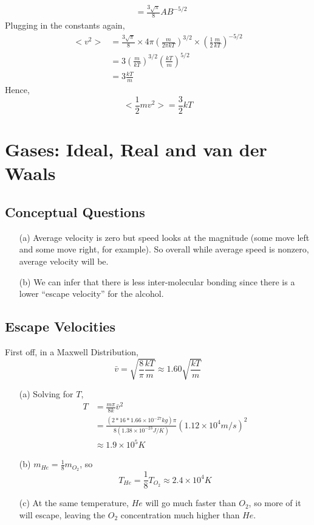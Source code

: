 \documentclass{article}
\begin{document}
\begin{itemize}
\begin{align*}
	&= \frac{3\sqrt{\pi}}{8}AB^{-5/2}
	\end{align*}
	Plugging in the constants again,
	\begin{align*}
	<v^2> &= \frac{3\sqrt{\pi}}{8}\times 4\pi\left(\frac{m}{2\pi kT}\right)^{3/2}\times \left(\frac{1}{2}\frac{m}{kT}\right)^{-5/2} \\
	&= 3\left(\frac{m}{kT}\right)^{3/2}\left(\frac{kT}{m}\right)^{5/2} \\
	&= 3\frac{kT}{m}
	\end{align*}
	Hence,
	\begin{equation}
	<\frac{1}{2}mv^2> = \frac{3}{2}kT
	\end{equation}
\end{itemize}

\newpage

\section{Gases: Ideal, Real and van der Waals}

\subsection{Conceptual Questions}

\begin{itemize}
	\item[(a)] Average velocity is zero but speed looks at the magnitude (some move left and some move right, for example). So overall while average speed is nonzero, average velocity will be.
	\item[(b)] We can infer that there is less inter-molecular bonding since there is a lower ``escape velocity'' for the alcohol.
\end{itemize}

\subsection{Escape Velocities}

First off, in a Maxwell Distribution,
\begin{equation}
\bar{v}=\sqrt{\frac{8}{\pi}\frac{kT}{m}} \approx 1.60\sqrt{\frac{kT}{m}}
\end{equation}
\begin{itemize}
	\item[(a)] Solving for $T$,
	\begin{align*}
	T &= \frac{m\pi}{8k}\bar{v}^2 \\
	&= \frac{(2*16*1.66\times10^{-27} kg)\pi}{8(1.38\times10^{-23} J/K)}(1.12\times 10^4 m/s)^2 \\
	&\approx 1.9\times10^5 K
	\end{align*}
	\item[(b)] $m_{He} = \frac{1}{8}m_{O_2}$, so
	\begin{equation}
	T_{He} = \frac{1}{8}T_{O_2}\approx2.4\times10^4 K
	\end{equation}
	\item[(c)] At the same temperature, $He$ will go much faster than $O_2$, so more of it will escape, leaving the $O_2$ concentration much higher than $He$.
\end{itemize}
\end{document}
